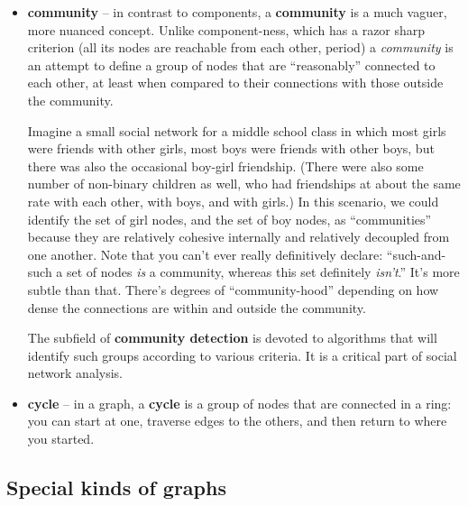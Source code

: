 \begin{itemize}

\item \textbf{community} -- in contrast to components, a \textbf{community} is
a much vaguer, more nuanced concept. Unlike component-ness, which has a razor
sharp criterion (all its nodes are reachable from each other, period) a
\textit{community} is an attempt to define a group of nodes that are
``reasonably'' connected to each other, at least when compared to their
connections with those outside the community.


Imagine a small social network for a middle school class in which most girls
were friends with other girls, most boys were friends with other boys, but
there was also the occasional boy-girl friendship. (There were also some number
of non-binary children as well, who had friendships at about the same rate
with each other, with boys, and with girls.) In this scenario, we could
identify the set of girl nodes, and the set of boy nodes, as ``communities''
because they are relatively cohesive internally and relatively decoupled from
one another. Note that you can't ever really definitively declare:
``such-and-such a set of nodes \textit{is} a community, whereas this set
definitely \textit{isn't}.'' It's more subtle than that. There's degrees of
``community-hood'' depending on how dense the connections are within and
outside the community.


The subfield of \textbf{community detection} is devoted to algorithms that
will identify such groups according to various criteria. It is a critical part
of social network analysis.


\item \textbf{cycle} -- in a graph, a \textbf{cycle} is a group of nodes that
are connected in a ring: you can start at one, traverse edges to the others,
and then return to where you started.

\end{itemize}

\subsection{Special kinds of graphs}


